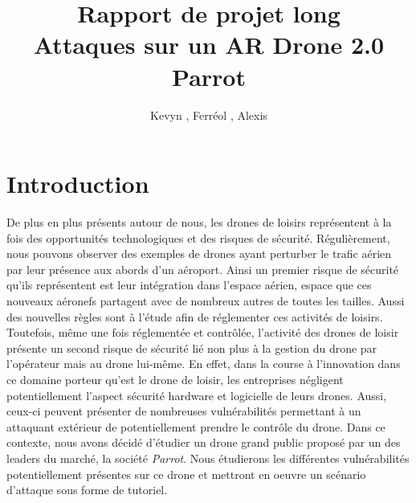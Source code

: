 \documentclass[a4paper,12pt]{report}
\title{Rapport de projet long \\ Attaques sur un AR Drone 2.0 Parrot}
\author{Kevyn \bsc{Ledieu}, Ferréol \bsc{Pennel}, Alexis \bsc{Pernot}}
\begin{document}
\maketitle
\tableofcontents
\newpage

\section{Introduction}
De plus en plus présents autour de nous, les drones de loisirs représentent à la fois des opportunités technologiques et des risques de sécurité. Régulièrement, nous pouvons observer des exemples de drones ayant perturber le trafic aérien par leur présence aux abords d'un aéroport. Ainsi un premier risque de sécurité qu'ils représentent est leur intégration dans l'espace aérien, espace que ces nouveaux aéronefs partagent avec de nombreux autres de toutes les tailles. Aussi des nouvelles règles sont à l'étude afin de réglementer ces activités de loisirs. Toutefois, même une fois réglementée et contrôlée, l'activité des drones de loisir présente un second risque de sécurité lié non plus à la gestion du drone par l'opérateur mais au drone lui-même. En effet, dans la course à l'innovation dans ce domaine porteur qu'est le drone de loisir, les entreprises négligent potentiellement l'aspect sécurité hardware et logicielle de leurs drones. Aussi, ceux-ci peuvent présenter de nombreuses vulnérabilités permettant à un attaquant extérieur de potentiellement prendre le contrôle du drone. Dans ce contexte, nous avons décidé d'étudier un drone grand public proposé par un des leaders du marché, la société \textit{Parrot}. Nous étudierons les différentes vulnérabilités potentiellement présentes sur ce drone et mettront en oeuvre un scénario d'attaque sous forme de tutoriel.










\end{document}
